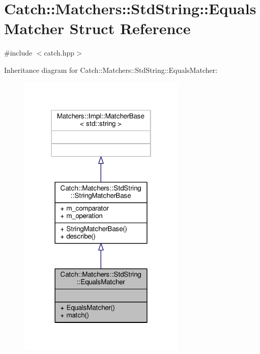 \hypertarget{struct_catch_1_1_matchers_1_1_std_string_1_1_equals_matcher}{\section{Catch\-:\-:Matchers\-:\-:Std\-String\-:\-:Equals\-Matcher Struct Reference}
\label{struct_catch_1_1_matchers_1_1_std_string_1_1_equals_matcher}
}


{\ttfamily \#include $<$catch.\-hpp$>$}



Inheritance diagram for Catch\-:\-:Matchers\-:\-:Std\-String\-:\-:Equals\-Matcher\-:
\nopagebreak
\begin{figure}[H]
\begin{center}
\leavevmode
\includegraphics[width=226pt]{struct_catch_1_1_matchers_1_1_std_string_1_1_equals_matcher__inherit__graph}
\end{center}
\end{figure}



